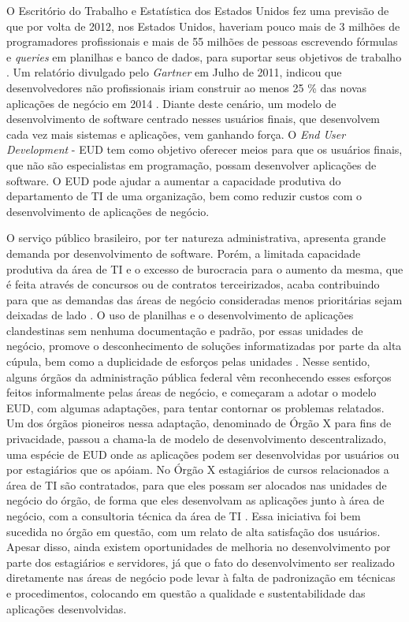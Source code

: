 O Escritório do Trabalho e Estatística dos Estados Unidos fez uma previsão de que por volta de 2012, nos Estados Unidos, haveriam pouco mais de 3 milhões de programadores profissionais e mais de 55 milhões de pessoas escrevendo fórmulas e \textit{queries} em planilhas e banco de dados, para suportar seus objetivos de trabalho \cite{scaffidi2005}. Um relatório divulgado pelo \textit{Gartner} em Julho de 2011, indicou que desenvolvedores não profissionais iriam construir ao menos 25 \% das novas aplicações de negócio em 2014 \cite{paterno2013}. Diante deste cenário, um modelo de desenvolvimento de software centrado nesses usuários finais, que desenvolvem cada vez mais sistemas e aplicações, vem ganhando força. O \textit{End User Development} - EUD tem como objetivo oferecer meios para que os usuários finais, que não são especialistas em programação, possam desenvolver aplicações de software. O EUD pode ajudar a aumentar a capacidade produtiva do departamento de TI de uma organização, bem como reduzir custos com o desenvolvimento de aplicações de negócio.

O serviço público brasileiro, por ter natureza administrativa, apresenta grande demanda por desenvolvimento de software. Porém, a limitada capacidade produtiva da área de TI e o excesso de burocracia para o aumento da mesma, que é feita através de concursos ou de contratos terceirizados, acaba contribuindo para que as demandas das áreas de negócio consideradas menos prioritárias sejam deixadas de lado \cite{artigoTcuGovTI}. O uso de planilhas e o desenvolvimento de aplicações clandestinas sem nenhuma documentação e padrão, por essas unidades de negócio, promove o desconhecimento de soluções informatizadas por parte da alta cúpula, bem como a duplicidade de esforços pelas unidades \cite{slideTCU}. Nesse sentido, alguns órgãos da administração pública federal vêm reconhecendo esses esforços feitos informalmente pelas áreas de negócio, e começaram a adotar o modelo EUD, com algumas adaptações, para tentar contornar os problemas relatados. Um dos órgãos pioneiros nessa adaptação, denominado de Órgão X para fins de privacidade, passou a chama-la de modelo de desenvolvimento descentralizado, uma espécie de EUD onde as aplicações podem ser desenvolvidas por usuários ou por estagiários que os apóiam. No Órgão X estagiários de cursos relacionados a área de TI são contratados, para que eles possam ser alocados nas unidades de negócio do órgão, de forma que eles desenvolvam as aplicações junto à área de negócio, com a consultoria técnica da área de TI \cite{slideTCU}. Essa iniciativa foi bem sucedida no órgão em questão, com um relato de alta satisfação dos usuários. Apesar disso, ainda existem oportunidades de melhoria no desenvolvimento por parte dos estagiários e servidores, já que o fato do desenvolvimento ser realizado diretamente nas áreas de negócio pode levar à falta de padronização em técnicas e procedimentos, colocando em questão a qualidade e sustentabilidade das aplicações desenvolvidas.


